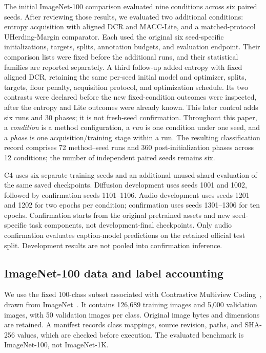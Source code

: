 \documentclass[a4paper,fleqn]{cas-dc}
\begin{document}
The initial ImageNet-100 comparison evaluated nine conditions across six
paired seeds. After reviewing those results, we evaluated two additional
conditions: entropy acquisition with aligned DCR and MACC-Lite, and a
matched-protocol UHerding-Margin comparator. Each used the original six
seed-specific initializations, targets, splits, annotation budgets, and
evaluation endpoint. Their comparison lists were fixed before the
additional runs, and their statistical families are reported separately.
A third follow-up added entropy with fixed aligned DCR, retaining the
same per-seed initial model and optimizer, splits, targets, floor penalty,
acquisition protocol, and optimization schedule. Its two contrasts were
declared before the new fixed-condition outcomes were inspected, after
the entropy and Lite outcomes were already known. This later control
adds six runs and 30 phases; it is not fresh-seed confirmation.
Throughout this paper, a \emph{condition} is a method configuration, a
\emph{run} is one condition under one seed, and a \emph{phase} is one
acquisition/training stage within a run. The resulting classification
record comprises 72 method--seed runs and 360 post-initialization phases
across 12 conditions; the number of independent paired seeds remains six.

C4 uses six separate training seeds and an additional unused-shard
evaluation of the same saved checkpoints.
Diffusion development uses seeds 1001 and 1002, followed by
confirmation seeds 1101--1106. Audio development uses seeds
1201 and 1202 for two epochs per condition; confirmation uses
seeds 1301--1306 for ten epochs. Confirmation starts from the
original pretrained assets and new seed-specific task components,
not development-final checkpoints. Only audio confirmation
evaluates caption-model predictions on the retained official test
split. Development results are not pooled into confirmation inference.

\subsection{ImageNet-100 data and label accounting}

We use the fixed 100-class subset associated with Contrastive
Multiview Coding~\cite{tian2020cmc}, drawn from
ImageNet~\cite{deng2009imagenet}.
It contains 126,689 training images and 5,000 validation images,
with 50 validation images per class. Original image bytes and
dimensions are retained. A manifest records class mappings, source
revision, paths, and SHA-256 values, which are checked before
execution. The evaluated benchmark is ImageNet-100, not ImageNet-1K.
\end{document}
